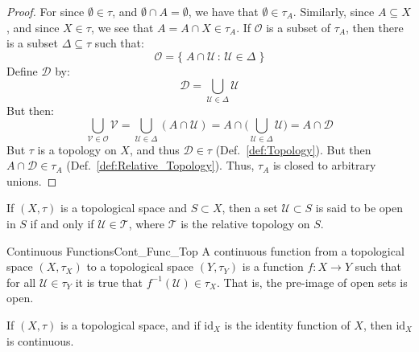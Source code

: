     \begin{proof}
        For since $\emptyset\in\tau$, and $\emptyset\cap{A}=\emptyset$, we have
        that $\emptyset\in\tau_{A}$. Similarly, since $A\subseteq{X}$, and
        since $X\in\tau$, we see that $A=A\cap{X}\in\tau_{A}$. If $\mathcal{O}$
        is a subset of $\tau_{A}$, then there is a subset $\Delta\subseteq\tau$
        such that:
        \begin{equation}
            \mathcal{O}=\big\{\;A\cap\mathcal{U}\,:\,\mathcal{U}\in\Delta\;\}
        \end{equation}
        Define $\mathcal{D}$ by:
        \begin{equation}
            \mathcal{D}=\bigcup_{\mathcal{U}\in\Delta}\mathcal{U}
        \end{equation}
        But then:
        \begin{equation}
            \bigcup_{\mathcal{V}\in\mathcal{O}}\mathcal{V}
            =\bigcup_{\mathcal{U}\in\Delta}(A\cap\mathcal{U})
            =A\cap\Big(\bigcup_{\mathcal{U}\in\Delta}\mathcal{U}\Big)
            =A\cap\mathcal{D}
        \end{equation}
        But $\tau$ is a topology on $X$, and thus $\mathcal{D}\in\tau$
        (Def.~\ref{def:Topology}). But then $A\cap\mathcal{D}\in\tau_{A}$
        (Def.~\ref{def:Relative_Topology}). Thus, $\tau_{A}$
        is closed to arbitrary unions.
    \end{proof}
    \begin{definition}
        If $(X,\tau)$ is a topological space and $S\subset{X}$, then a set
        $\mathcal{U}\subset S$ is said to be open in $S$ if and only if
        $\mathcal{U}\in \mathscr{T}$, where $\mathscr{T}$ is the relative
        topology on $S$.
    \end{definition}
    \begin{fdefinition}{Continuous Functions}{Cont_Func_Top}
        A continuous function from a
        topological space $(X,\tau_{X})$ to a topological space $(Y,\tau_{Y})$
        is a function $f:X\rightarrow{Y}$ such that for all
        $\mathcal{U}\in\tau_{Y}$ it is true that
        $f^{\minus{1}}(\mathcal{U})\in\tau_{X}$. That is, the pre-image of open
        sets is open.
    \end{fdefinition}
    \begin{theorem}
        If $(X,\tau)$ is a topological space, and if $\textrm{id}_{X}$ is the
        identity function of $X$, then $\textrm{id}_{X}$ is continuous.
    \end{theorem}
